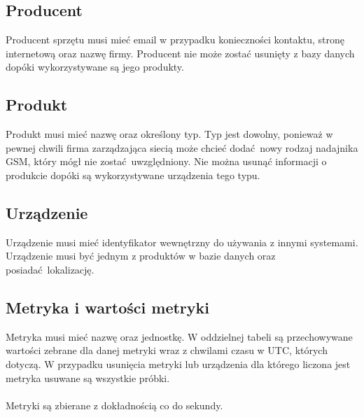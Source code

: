 \documentclass[a4paper, 12pt]{article}
\begin{document}
        \subsection{Producent}
            Producent sprzętu musi mieć email w przypadku konieczności kontaktu,
            stronę internetową oraz nazwę firmy. Producent nie może zostać usunięty
            z bazy danych dopóki wykorzystywane są jego produkty.
        \subsection{Produkt}
            Produkt musi mieć nazwę oraz określony typ. Typ jest dowolny, 
            ponieważ w pewnej chwili firma zarządzająca siecią może chcieć 
            dodać nowy rodzaj nadajnika GSM, który mógł nie zostać uwzględniony.
            Nie można usunąć informacji o produkcie dopóki są wykorzystywane 
            urządzenia tego typu.
        \subsection{Urządzenie}
            Urządzenie musi mieć identyfikator wewnętrzny do używania z innymi
            systemami. Urządzenie musi być jednym z produktów w bazie danych
            oraz posiadać lokalizację.
        \subsection{Metryka i wartości metryki}
            Metryka musi mieć nazwę oraz jednostkę. W oddzielnej tabeli są 
            przechowywane wartości zebrane dla danej metryki wraz z chwilami
            czasu w UTC, których dotyczą. W przypadku usunięcia metryki lub
            urządzenia dla którego liczona jest metryka usuwane są wszystkie
            próbki.
            \\ \\
            Metryki są zbierane z dokładnością co do sekundy.
\end{document}
